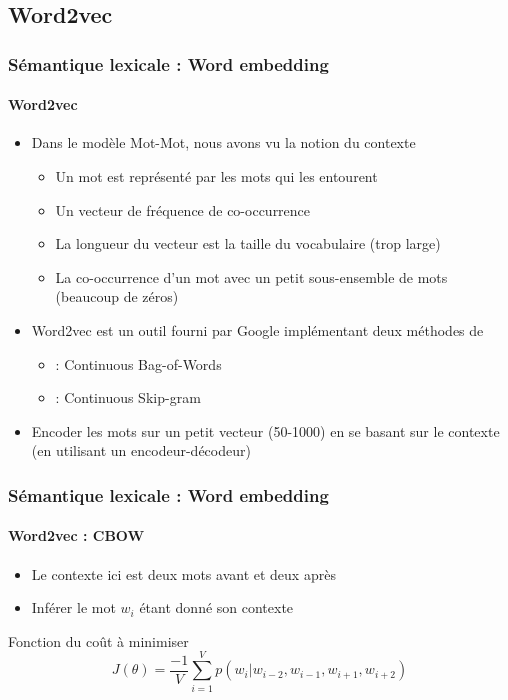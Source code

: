 \documentclass[xcolor=table]{beamer}
\begin{document}
\subsection{Word2vec}

\begin{frame}
\frametitle{Sémantique lexicale : Word embedding}
\framesubtitle{Word2vec}

\begin{itemize}
	\item Dans le modèle Mot-Mot, nous avons vu la notion du contexte 
	\begin{itemize}
		\item Un mot est représenté par les mots qui les entourent
		\item Un vecteur de fréquence de co-occurrence
		\item La longueur du vecteur est la taille du vocabulaire (trop large)
		\item La co-occurrence d'un mot avec un petit sous-ensemble de mots (beaucoup de zéros)
	\end{itemize}
	\item Word2vec est un outil fourni par Google implémentant deux méthodes de  \cite{2013-mikolov-al}
	\begin{itemize}
		\item {} : Continuous Bag-of-Words
		\item {} : Continuous Skip-gram
	\end{itemize}
	\item Encoder les mots sur un petit vecteur (50-1000) en se basant sur le contexte (en utilisant un encodeur-décodeur)
\end{itemize}

\end{frame}

\begin{frame}
	\frametitle{Sémantique lexicale : Word embedding}
	\framesubtitle{Word2vec : CBOW}
\begin{minipage}{.58\textwidth}
	\begin{itemize}
		\item Le contexte ici est deux mots avant et deux après
		\item Inférer le mot $w_i$ étant donné son contexte
	\end{itemize}
	\begin{block}{Fonction du coût à minimiser}
		\[%
		J(\theta) = \frac{-1}{V} \sum_{i=1}^{V} p(w_i |w_{i-2}, w_{i-1}, w_{i+1}, w_{i+2})
		\]
	\end{block}
\end{minipage}
\begin{minipage}{.08\textwidth}
\end{minipage}	
\begin{minipage}{.4\textwidth}
\end{minipage}
	
\end{frame}
\end{document}
